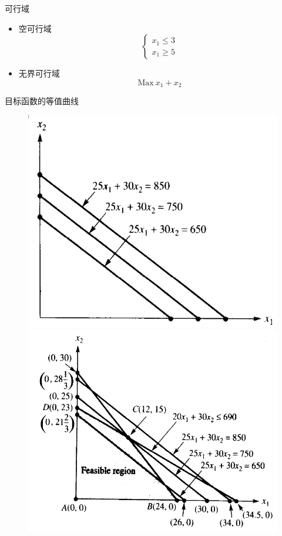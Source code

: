 \documentclass[UTF8]{ctexbeamer}
\begin{document}
\begin{frame}{可行域}
  \begin{itemize}
  \item 空可行域
    \[
    \left\{
    \begin{array}{l}
      x_1 \le 3\\
      x_1 \ge 5
    \end{array}
    \right.
    \]
  \item 无界可行域
    \[
    \mbox{Max}\ x_1 + x_2
    \]
  \end{itemize}
\end{frame}

\begin{frame}{目标函数的等值曲线}
  \begin{figure}
      \includegraphics[width=.4\textwidth{}]{level.png}
      \includegraphics[width=.5\textwidth{}]{levelcons.png}
  \end{figure}
\end{frame}
\end{document}
